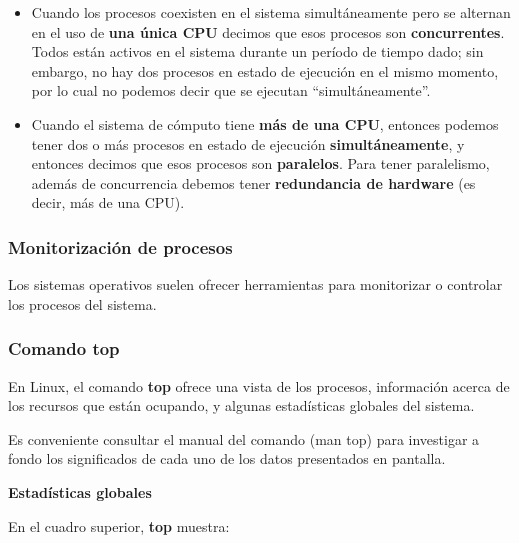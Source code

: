 \documentclass[spanish,A4,]{article}
\begin{document}
\begin{itemize}
\item
  Cuando los procesos coexisten en el sistema simultáneamente pero se
  alternan en el uso de \textbf{una única CPU} decimos que esos procesos
  son \textbf{concurrentes}. Todos están activos en el sistema durante
  un período de tiempo dado; sin embargo, no hay dos procesos en estado
  de ejecución en el mismo momento, por lo cual no podemos decir que se
  ejecutan ``simultáneamente''.
\item
  Cuando el sistema de cómputo tiene \textbf{más de una CPU}, entonces
  podemos tener dos o más procesos en estado de ejecución
  \textbf{simultáneamente}, y entonces decimos que esos procesos son
  \textbf{paralelos}. Para tener paralelismo, además de concurrencia
  debemos tener \textbf{redundancia de hardware} (es decir, más de una
  CPU).
\end{itemize}

\subsubsection{Monitorización de
procesos}\label{monitorizaciuxf3n-de-procesos}

Los sistemas operativos suelen ofrecer herramientas para monitorizar o
controlar los procesos del sistema.

\subsubsection{Comando top}\label{comando-top}

En Linux, el comando \textbf{top} ofrece una vista de los procesos,
información acerca de los recursos que están ocupando, y algunas
estadísticas globales del sistema.

Es conveniente consultar el manual del comando (man top) para investigar
a fondo los significados de cada uno de los datos presentados en
pantalla.

\textbf{Estadísticas globales}

En el cuadro superior, \textbf{top} muestra:
\end{document}
